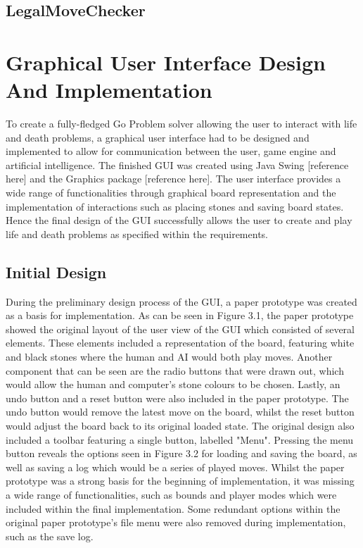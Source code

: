 \documentclass{l3proj}
\begin{document}
\subsection{LegalMoveChecker}

\section{Graphical User Interface Design And Implementation}

To create a fully-fledged Go Problem solver allowing the user to interact with life and death problems, a graphical user interface had to be designed and implemented to allow for communication between the user, game engine and artificial intelligence. The finished GUI was created using Java Swing [reference here] and the Graphics package [reference here]. The user interface provides a wide range of functionalities through graphical board representation and the implementation of interactions such as placing stones and saving board states. Hence the final design of the GUI successfully allows the user to create and play life and death problems as specified within the requirements.

\subsection{Initial Design}

During the preliminary design process of the GUI, a paper prototype was created as a basis for implementation. As can be seen in Figure 3.1, the paper prototype showed the original layout of the user view of the GUI which consisted of several elements. These elements included a representation of the board, featuring white and black stones where the human and AI would both play moves. Another component that can be seen are the radio buttons that were drawn out, which would allow the human and computer's stone colours to be chosen. Lastly, an undo button and a reset button were also included in the paper prototype. The undo button would remove the latest move on the board, whilst the reset button would adjust the board back to its original loaded state. The original design also included a toolbar featuring a single button, labelled "Menu".  Pressing the menu button reveals the options seen in Figure 3.2 for loading and saving the board, as well as saving a log which would be a series of played moves. Whilst the paper prototype was a strong basis for the beginning of implementation, it was missing a wide range of functionalities, such as bounds and player modes which were included within the final implementation. Some redundant options within the original paper prototype's file menu were also removed during implementation, such as the save log.
\end{document}
